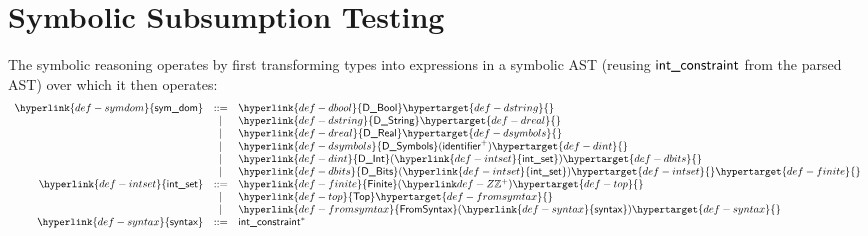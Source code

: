 \documentclass{book}
\begin{document}
\chapter{Symbolic Subsumption Testing \label{chap:symbolicsubsumptiontesting}}
\newcommand\symdom[0]{\hyperlink{def-symdom}{\textsf{sym\_dom}}}
\newcommand\intset[0]{\hyperlink{def-intset}{\textsf{int\_set}}}
\newcommand\syntax[0]{\hyperlink{def-syntax}{\textsf{syntax}}}

\newcommand\DBool[0]{\hyperlink{def-dbool}{\textsf{D\_Bool}}}
\newcommand\DString[0]{\hyperlink{def-dstring}{\textsf{D\_String}}}
\newcommand\DReal[0]{\hyperlink{def-dreal}{\textsf{D\_Real}}}
\newcommand\DSymbols[0]{\hyperlink{def-dsymbols}{\textsf{D\_Symbols}}}
\newcommand\DInt[0]{\hyperlink{def-dint}{\textsf{D\_Int}}}
\newcommand\DBits[0]{\hyperlink{def-dbits}{\textsf{D\_Bits}}}

\newcommand\Finite[0]{\hyperlink{def-finite}{\textsf{Finite}}}
\newcommand\Top[0]{\hyperlink{def-top}{\textsf{Top}}}
\newcommand\FromSyntax[0]{\hyperlink{def-fromsymtax}{\textsf{FromSyntax}}}

\newcommand\symdomoftype[0]{\hyperlink{def-symdomoftype}{\texttt{symdom\_of\_type}}}
\newcommand\symdomofexpr[0]{\hyperlink{def-symdomofexpr}{\texttt{symdom\_of\_expr}}}
\newcommand\symdomofliteral[0]{\hyperlink{def-symdomofliteral}{\texttt{symdom\_of\_literal}}}
\newcommand\intsetofintconstraints[0]{\hyperlink{def-intsetofintconstraintse}{\texttt{intset\_of\_intconstraints}}}
\newcommand\symdomissubset[0]{\hyperlink{def-symdomissubset}{\texttt{symdom\_is\_subset}}}
\newcommand\symintsetsubset[0]{\hyperlink{def-symintsetsubset}{\texttt{sym\_intset\_subset}}}

The symbolic reasoning operates by first transforming types into expressions in a symbolic AST
(reusing $\textsf{int\_constraint}$ from the parsed AST) over which it then operates:
\hypertarget{def-symdom}{}
\hypertarget{def-dbool}{}
\[
  \begin{array}{rcl}
    \symdom &::=& \DBool                    \hypertarget{def-dstring}{}\\
            &|  & \DString                  \hypertarget{def-dreal}{}\\
            &|  & \DReal                    \hypertarget{def-dsymbols}{}\\
            &|  & \DSymbols(\identifier^+)  \hypertarget{def-dint}{}\\
            &|  & \DInt(\intset)            \hypertarget{def-dbits}{}\\
            &|  & \DBits(\intset)           \hypertarget{def-intset}{} \hypertarget{def-finite}{}\\
    \intset &::=& \Finite(\Z^+)             \hypertarget{def-top}{}\\
            &|  & \Top                      \hypertarget{def-fromsymtax}{}\\
            &|  & \FromSyntax(\syntax)      \hypertarget{def-syntax}{}\\
    \syntax &::=& \intconstraint^*
  \end{array}
\]
\end{document}
